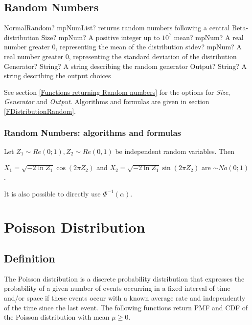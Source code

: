 \subsection{Random Numbers}
\label{NormalDistributionRandom}


\begin{mpFunctionsExtract}
	\mpFunctionFive
	{NormalRandom? mpNumList? returns random numbers following a central Beta-distribution}
	{Size? mpNum? A positive integer up to $10^7$}
	{mean? mpNum? A real number greater 0, representing the mean of the distribution}
	{stdev? mpNum? A real number greater 0, representing the standard deviation of the distribution}
	{Generator? String? A string describing the random generator}
	{Output? String? A string describing the output choices}
\end{mpFunctionsExtract}

\vspace{0.3cm}

See section \ref{Functions returning Random numbers} for the options for  {\itshape\sffamily Size},  {\itshape\sffamily Generator} and {\itshape\sffamily Output}. Algorithms and formulas are given in section \ref{FDistributionRandom}.


\subsubsection{Random Numbers: algorithms and formulas}
Let $Z_1 \sim Re(0;1), Z_2 \sim Re(0,1)$ be independent random variables. Then

\vspace{0.3cm}
$X_1 = \sqrt{-2 \ln Z_1} \cos(2 \pi Z_2)$ and $X_2 = \sqrt{-2 \ln Z_1} \sin(2 \pi Z_2)$ are $\sim No(0;1)$.


\vspace{0.3cm}
It is also possible to directly use $\Phi^{-1}(\alpha)$.





\section{Poisson Distribution}
\label{PoissonDistribution}

\subsection{Definition}
The Poisson distribution is a discrete probability distribution that expresses the probability of a given number of events occurring in a fixed interval of time and/or space if these events occur with a known average rate and independently of the time since the last event.
The following functions return PMF and CDF of the Poisson distribution with mean $\mu \geq 0$.



